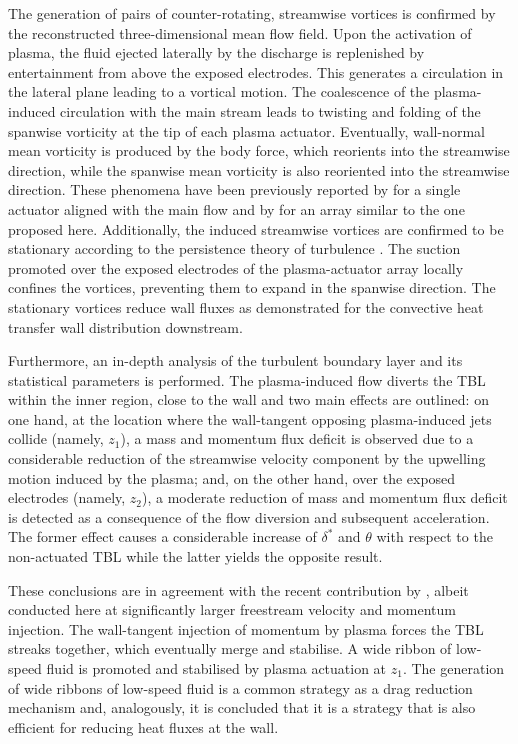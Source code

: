 The generation of pairs of counter-rotating, streamwise vortices is confirmed by the reconstructed three-dimensional mean flow field. Upon the activation of plasma, the fluid ejected laterally by the discharge is replenished by entertainment from above the exposed electrodes. This generates a circulation in the lateral plane leading to a vortical motion. The coalescence of the plasma-induced circulation with the main stream leads to twisting and folding of the spanwise vorticity at the tip of each plasma actuator. Eventually, wall-normal mean vorticity is produced by the body force, which reorients into the streamwise direction, while the spanwise mean vorticity is also reoriented into the streamwise direction. These phenomena have been previously reported by \citet{jukes2013plasmaVG} for a single actuator aligned with the main flow and by \citet{Wicks2015} for an array similar to the one proposed here. Additionally, the induced streamwise vortices are confirmed to be stationary according to the persistence theory of turbulence \citep{Cotel1996stationary}. The suction promoted over the exposed electrodes of the plasma-actuator array locally confines the vortices, preventing them to expand in the spanwise direction. The stationary vortices reduce wall fluxes as demonstrated for the convective heat transfer wall distribution downstream. 

Furthermore, an in-depth analysis of the turbulent boundary layer and its statistical parameters is performed. The plasma-induced flow diverts the TBL within the inner region, close to the wall and two main effects are outlined: on one hand, at the location where the wall-tangent opposing plasma-induced jets collide (namely, $z_1$), a mass and momentum flux deficit is observed due to a considerable reduction of the streamwise velocity component by the upwelling motion induced by the plasma; and, on the other hand, over the exposed electrodes (namely, $z_2$), a moderate reduction of mass and momentum flux deficit is detected as a consequence of the flow diversion and subsequent acceleration. The former effect causes a considerable increase of $\delta^*$ and $\theta$ with respect to the non-actuated TBL while the latter yields the opposite result.

These conclusions are in agreement with the recent contribution by \citet{cheng_wong_hussain_schroder_zhou_2021}, albeit conducted here at significantly larger freestream velocity and momentum injection. The wall-tangent injection of momentum by plasma forces the TBL streaks together, which eventually merge and stabilise. A wide ribbon of low-speed fluid is promoted and stabilised by plasma actuation at $z_1$. The generation of wide ribbons of low-speed fluid is a common strategy as a drag reduction mechanism \cite[e.g.][]{Schoppa1998,Du2002, Whalley2014,cheng_wong_hussain_schroder_zhou_2021} and, analogously, it is concluded that it is a strategy that is also efficient for reducing heat fluxes at the wall.

